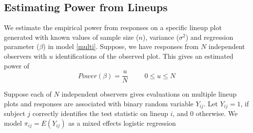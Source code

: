 \documentclass{article}
\begin{document}




%


\subsection{Estimating Power from Lineups}

We estimate the empirical power from responses on a specific lineup plot  generated with known values of sample size ($n$), variance ($\sigma^2$) and regression parameter ($\beta$) in model \ref{multi}. Suppose, we have responses from $N$ independent observers with $u$ identifications of the observed plot. This gives an estimated power of
\begin{equation}\label{power_est} Power(\beta)=\frac{u}{N} \hspace{1cm} 0 \le u \le N \end{equation}

Suppose each of $N$ independent observers gives evaluations on multiple lineup plots and responses are associated with binary random variable $Y_{ij}$. Let $Y_{ij} = 1$, if subject $j$ correctly identifies the test statistic on lineup $i$, and 0 otherwise.
We model $\pi_{ij} = E(Y_{ij})$ as  a mixed effects logistic regression
\end{document}
